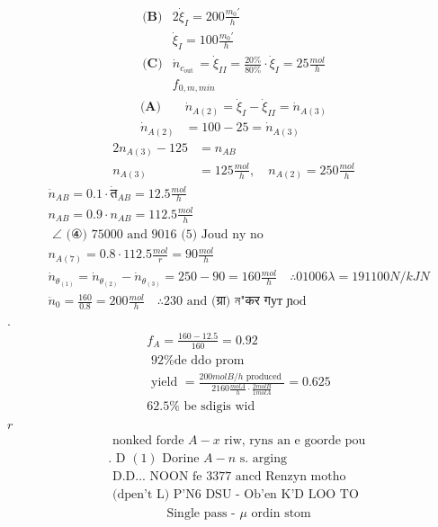 \documentclass[12pt]{article}
\begin{document}
\[
\begin{array}{ll}
\textbf{(B)}
& 2 \dot{\xi}_{I}=200 \frac{m_{0} \prime}{h} \\
& \dot{\xi}_{I}=100 \frac{m_{0} \prime}{h} \\
\textbf{(C)}
& \dot{n}_{c_{\text {out }}}=\dot{\xi}_{I I}=\frac{20 \%}{80 \%} \cdot \dot{\xi}_{I}=25 \frac{mol}{h} \\
& f_{0, m, min}
\end{array}
\]
\[
\begin{aligned}
\textbf{(A)}
& \dot{n}_{A(2)}=\dot{\xi}_{I}-\dot{\xi}_{I I}=\dot{n}_{A(3)} \\
\dot{n}_{A(2)} & =100-25=\dot{n}_{A(3)}
\end{aligned}
\]
\[
\begin{aligned}
2 n_{A(3)}-125 & =n_{A B} \\
n_{A(3)} & =125 \frac{mol}{h}, \quad n_{A(2)}=250 \frac{mol}{h}
\end{aligned}
\]
\[
\begin{aligned}
& \dot{n}_{A B}=0.1 \cdot \dot{त}_{A B}=12.5 \frac{mol}{h} \\
& n_{A B}=0.9 \cdot n_{A B}=112.5 \frac{mol}{h} \\
& \text { ∠ (④) 75000 and } 9016 \text { (5) Joud ny no } \\
& n_{A(7)}=0.8 \cdot 112.5 \frac{mol}{r}=90 \frac{mol}{h} \\
& \dot{n}_{\theta_{(1)}}=\dot{n}_{\theta_{(2)}}-\dot{n}_{\theta_{(3)}}=250-90=160 \frac{mol}{h} \quad \therefore 01006 \lambda=191100 N / kJN \\
& \ddot{n}_{0}=\frac{160}{0.8}=200 \frac{mol}{h} \quad \therefore 230 \text { and (ग्रा) ন"कर गут ɲod }
\end{aligned}
\]
.
\[
\begin{aligned}
& f_{A}=\frac{160-12.5}{160}=0.92 \\
& \text { 92\% de ddo prom } \\
& \text { yield }=\frac{200 mol B / h \text { produced }}{2160 \frac{mol A}{h} \cdot \frac{2 mol B}{1 mol A}}=0.625 \\
& 62.5 \% \text { be sdigis wid }
\end{aligned}
\]
\(r\)
\[
\begin{aligned}
& \text { nonked forde } A-x \text { riw, ryns an e goorde pou } \\
& \text {. D }(1) \text { Dorine } A-n \text { s. arging } \\
& \text { D.D... NOON fe } 3377 \text { ancd Renzyn motho } \\
& \text { (dpen't L) P'N6 DSU - Ob'en K'D LOO TO }
\end{aligned}
\]
\[
\begin{aligned}
& \text { Single pass - } \mu \text { ordin stom }
\end{aligned}
\]
\end{document}
